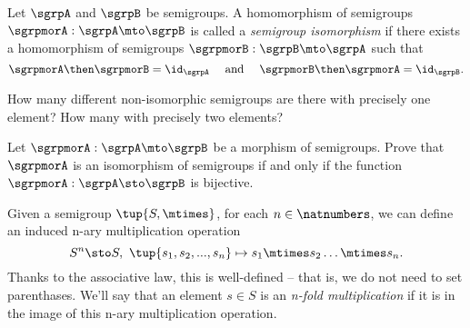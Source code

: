 \begin{definition}
  \label{def:semigroup-iso}
Let $\sgrpA$ and $\sgrpB$ be semigroups. A homomorphism of semigroups $\sgrpmorA: \sgrpA \mto \sgrpB$ is called a \emph{semigroup isomorphism} if there exists a homomorphism of semigroups $\sgrpmorB: \sgrpB \mto \sgrpA$ such that 
\begin{equation}\label{sgrp-iso-cond}
\sgrpmorA \then \sgrpmorB = \id_\sgrpA \quad \text{ and } \quad  \sgrpmorB \then \sgrpmorA = \id_\sgrpB. 
\end{equation} 
\end{definition}

\begin{exercise}
How many different non-isomorphic semigroups are there with precisely one element? How many with precisely two elements?
\end{exercise}

\begin{exercise}
Let $\sgrpmorA: \sgrpA \mto \sgrpB$ be a morphism of semigroups. Prove that $\sgrpmorA$ is an isomorphism of semigroups if and only if the function $\sgrpmorA: \sgrpA \sto \sgrpB$ is bijective. 
\end{exercise}


Given a semigroup $\tup{S, \mtimes}$, for each $n \in \natnumbers$, we can define an induced n-ary multiplication operation
$$
S^n \sto S, \ \tup{s_1, s_2, ..., s_n} \mapsto s_1 \mtimes s_2 \dots \mtimes s_n.
$$
Thanks to the associative law, this is well-defined -- that is, we do not need to set parenthases. We'll say that an element $s \in S$ is an \emph{n-fold multiplication} if it is in the image of this n-ary multiplication operation. 



